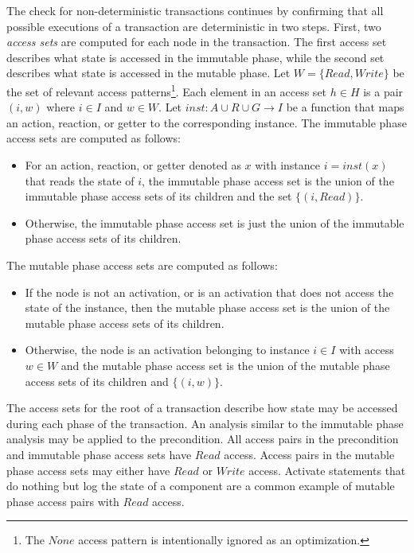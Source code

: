 The check for non-deterministic transactions continues by confirming that all possible executions of a transaction are deterministic in two steps.
First, two \emph{access sets} are computed for each node in the transaction.
The first access set describes what state is accessed in the immutable phase, while the second set describes what state is accessed in the mutable phase.
Let $W = \{ \mathit{Read}, \mathit{Write} \}$ be the set of relevant access patterns\footnote{The $\mathit{None}$ access pattern is intentionally ignored as an optimization.}.
Each element in an access set $h \in H$ is a pair $(i,w)$ where $i \in I$ and $w \in W$.
Let $\mathit{inst}: A \cup R \cup G \to I$ be a function that maps an action, reaction, or getter to the corresponding instance.
The immutable phase access sets are computed as follows:
\begin{itemize}
  \item For an action, reaction, or getter denoted as $x$ with instance $i = \mathit{inst}(x)$ that reads the state of $i$, the immutable phase access set is the union of the immutable phase access sets of its children and the set $\{ (i, \mathit{Read}) \}$.
  \item Otherwise, the immutable phase access set is just the union of the immutable phase access sets of its children.
\end{itemize}
The mutable phase access sets are computed as follows:
\begin{itemize}
  \item If the node is not an activation, or is an activation that does not access the state of the instance, then the mutable phase access set is the union of the mutable phase access sets of its children.
  \item Otherwise, the node is an activation belonging to instance $i \in I$ with access $w \in W$ and the mutable phase access set is the union of the mutable phase access sets of its children and $\{ (i, w) \}$.
\end{itemize}
The access sets for the root of a transaction describe how state may be accessed during each phase of the transaction.
An analysis similar to the immutable phase analysis may be applied to the precondition.
All access pairs in the precondition and immutable phase access sets have $\mathit{Read}$ access.
Access pairs in the mutable phase access sets may either have $\mathit{Read}$ or $\mathit{Write}$ access.
Activate statements that do nothing but log the state of a component are a common example of mutable phase access pairs with $\mathit{Read}$ access.

